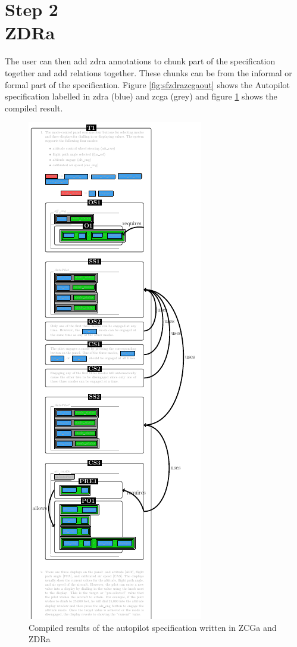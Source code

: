  \section{Step 2\\ZDRa}

 The user can then add \gls{zdra} annotations to chunk part of the specification
together and add relations together. These chunks can be from the informal or
formal part of the specification. Figure \ref{fig:sfzdrazcgaout} shows the Autopilot
specification labelled in \gls{zdra} (blue) and \gls{zcga} (grey) and figure
\ref{fig:sfcompzcgazdra} shows the compiled result.

\begin{figure}[H]
\centering
\includegraphics[scale=0.5]{Figures/fullexample/sfzdracorrectout.png}
\caption{Compiled results of the autopilot specification written in ZCGa and ZDRa \label{fig:sfcompzcgazdra}}
\end{figure}


